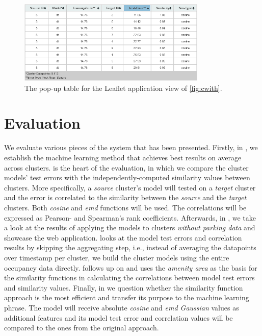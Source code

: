 \documentclass{ws-ijait}
\newcommand{\cmmnt}[1]{\ignorespaces}
\begin{document}
		\begin{figure}[!ht]
			\centering
			\includegraphics[width=0.8\textwidth]{../graphics/cwith_source_dt_cosine_table.png}
			\caption{The pop-up table for the Leaflet application view of \cref{fig:cwith}.}
			\label{fig:cwith_table}
		\end{figure}
		
		\section{Evaluation}
		We evaluate various pieces of the system that has been presented. Firstly, in \cmmnt{\cref{evaluation:best_model}}, we  establish the machine learning method that achieves best results on average across clusters. \cmmnt{\Cref{evaluation:similarity_vs_estimation_sec}} is the heart of the evaluation, in which we compare the cluster models' test errors with the independently-computed similarity values between clusters. More specifically, a \textit{source} cluster's model will tested on a \textit{target} cluster and the error is correlated to the similarity between the \textit{source} and the \textit{target} clusters. Both \textit{cosine} and \textit{emd} functions will be used. The correlations will be expressed as Pearson- and Spearman's rank coefficients. Afterwards, in \cmmnt{\cref{evaluation:estimations_cwout}}, we take a look at the results of applying the models to clusters \textit{without parking data} and showcase the web application. \cmmnt{\Cref{evaluation:entire_datapoints}} looks at the model test errors and correlation results by skipping the aggregating step, i.e., instead of averaging the datapoints over timestamp per cluster, we build the cluster models using the entire occupancy data directly. \cmmnt{\Cref{evaluation:amenity_area}} follows up on \cmmnt{\cref{experimental_setup:amenity_area}} and uses the \textit{amenity area} as the basis for the similarity functions in calculating the correlations between model test errors and similarity values. Finally, in \cmmnt{\cref{evaluation:machine_learning_better}} we question whether the similarity function approach is the most efficient and transfer its purpose to the machine learning phrase. The model will receive absolute \textit{cosine} and \textit{emd Gaussian} values as additional features and its model test error and correlation values will be compared to the ones from the original approach.
		
\end{document}
